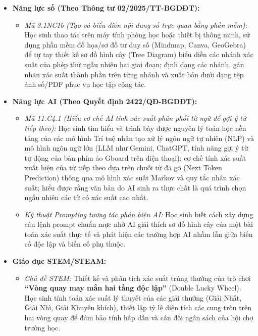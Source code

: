 \documentclass[12pt, a4paper]{article}
\begin{document}
\begin{itemize}[leftmargin=1.2cm]
    \item \textbf{Năng lực số (Theo Thông tư 02/2025/TT-BGDĐT):}
    \begin{itemize}[leftmargin=0.6cm]
        \item \textit{Mã 3.1NC1b (Tạo và biểu diễn nội dung số trực quan bằng phần mềm):} Học sinh thao tác trên máy tính phòng học hoặc thiết bị thông minh, sử dụng phần mềm đồ họa/sơ đồ tư duy số (Mindmap, Canva, GeoGebra) để tự tay thiết kế sơ đồ hình cây (Tree Diagram) biểu diễn các nhánh xác suất của phép thử ngẫu nhiên hai giai đoạn; định dạng các nhánh, gán nhãn xác suất thành phần trên từng nhánh và xuất bản dưới dạng tệp ảnh số/PDF phục vụ học tập cộng tác.
    \end{itemize}

    \item \textbf{Năng lực AI (Theo Quyết định 2422/QĐ-BGDĐT):}
    \begin{itemize}[leftmargin=0.6cm]
        \item \textit{Mã 11.C4.1 (Hiểu cơ chế AI tính xác suất phân phối từ ngữ để gợi ý từ tiếp theo):} Học sinh tìm hiểu và trình bày được nguyên lý toán học nền tảng của các mô hình Trí tuệ nhân tạo xử lý ngôn ngữ tự nhiên (NLP) và mô hình ngôn ngữ lớn (LLM như Gemini, ChatGPT, tính năng gợi ý từ tự động của bàn phím ảo Gboard trên điện thoại): cơ chế tính xác suất xuất hiện của từ tiếp theo dựa trên chuỗi từ đã gõ (Next Token Prediction) thông qua mô hình xác suất Markov và quy tắc nhân xác suất; hiểu được rằng văn bản do AI sinh ra thực chất là quá trình chọn ngẫu nhiên các từ có xác suất cao nhất.
        \item \textit{Kỹ thuật Prompting tương tác phản biện AI:} Học sinh biết cách xây dựng câu lệnh prompt chuẩn mực nhờ AI giải thích sơ đồ hình cây của một bài toán xác suất thực tế và phát hiện các trường hợp AI nhầm lẫn giữa biến cố độc lập và biến cố phụ thuộc.
    \end{itemize}

    \item \textbf{Giáo dục STEM/STEAM:}
    \begin{itemize}[leftmargin=0.6cm]
        \item \textit{Chủ đề STEM:} Thiết kế và phân tích xác suất trúng thưởng của trò chơi \textbf{``Vòng quay may mắn hai tầng độc lập''} (Double Lucky Wheel). Học sinh tính toán xác suất lý thuyết của các giải thưởng (Giải Nhất, Giải Nhì, Giải Khuyến khích), thiết lập tỷ lệ diện tích các cung tròn trên hai vòng quay để đảm bảo tính hấp dẫn và cân đối ngân sách của hội chợ trường học.
    \end{itemize}


\end{itemize}
\end{document}
